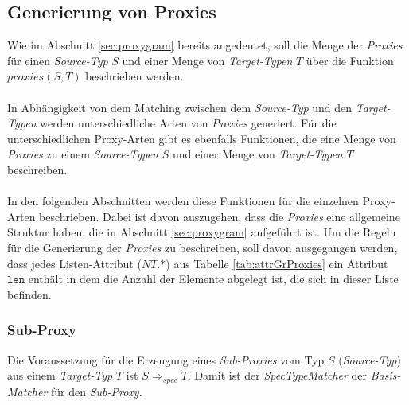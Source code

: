 \subsection{Generierung von Proxies}\label{sec_proxyGen}
Wie im Abschnitt \ref{sec:proxygram} bereits angedeutet, soll die Menge der \emph{Proxies} für einen \emph{Source-Typ} $S$ und einer Menge von \emph{Target-Typen} $T$ über die Funktion $\mathit{proxies(S,T)}$ beschrieben werden.
\\\\
In Abhängigkeit von dem Matching zwischen dem \emph{Source-Typ} und den \emph{Target-Typen} werden unterschiedliche Arten von \emph{Proxies} generiert. Für die unterschiedlichen Proxy-Arten gibt es ebenfalls Funktionen, die eine Menge von \emph{Proxies} zu einem \emph{Source-Typen} $S$ und einer Menge von \emph{Target-Typen} $T$ beschreiben.
\\\\
In den folgenden Abschnitten werden diese Funktionen für die einzelnen Proxy-Arten beschrieben. Dabei ist davon auszugehen, dass die \emph{Proxies} eine allgemeine Struktur haben, die in Abschnitt \ref{sec:proxygram} aufgeführt ist. Um die Regeln für die Generierung der \emph{Proxies} zu beschreiben, soll davon ausgegangen werden, dass jedes Listen-Attribut ($\mathit{NT.}\text{*}$) aus Tabelle \ref{tab:attrGrProxies} ein Attribut $\texttt{len}$ enthält in dem die Anzahl der Elemente abgelegt ist, die sich in dieser Liste befinden.


\subsubsection{Sub-Proxy}
Die Voraussetzung für die Erzeugung eines \emph{Sub-Proxies} vom Typ $S$ (\emph{Source-Typ}) aus einem \emph{Target-Typ} $T$ ist $S \Rightarrow_{spec} T$. Damit ist der \emph{SpecTypeMatcher} der \emph{Basis-Matcher} für den \emph{Sub-Proxy}.
